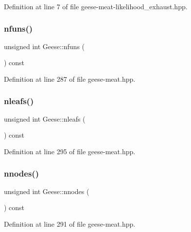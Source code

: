Definition at line 7 of file geese-\/meat-\/likelihood\+\_\+exhaust.\+hpp.

\mbox{\label{class_geese_ab0cad157fb0b22344ef7f0699451bd0e}} 
\subsubsection{\texorpdfstring{nfuns()}{nfuns()}}
{\footnotesize\ttfamily unsigned int Geese\+::nfuns (\begin{DoxyParamCaption}{ }\end{DoxyParamCaption}) const\hspace{0.3cm}{\ttfamily [inline]}}



Definition at line 287 of file geese-\/meat.\+hpp.

\mbox{\label{class_geese_a27e0d26d42088f51c8f93562b40df176}} 
\subsubsection{\texorpdfstring{nleafs()}{nleafs()}}
{\footnotesize\ttfamily unsigned int Geese\+::nleafs (\begin{DoxyParamCaption}{ }\end{DoxyParamCaption}) const\hspace{0.3cm}{\ttfamily [inline]}}



Definition at line 295 of file geese-\/meat.\+hpp.

\mbox{\label{class_geese_a62931bd6fbc8155ea5ac04e05f51b379}} 
\subsubsection{\texorpdfstring{nnodes()}{nnodes()}}
{\footnotesize\ttfamily unsigned int Geese\+::nnodes (\begin{DoxyParamCaption}{ }\end{DoxyParamCaption}) const\hspace{0.3cm}{\ttfamily [inline]}}



Definition at line 291 of file geese-\/meat.\+hpp.


